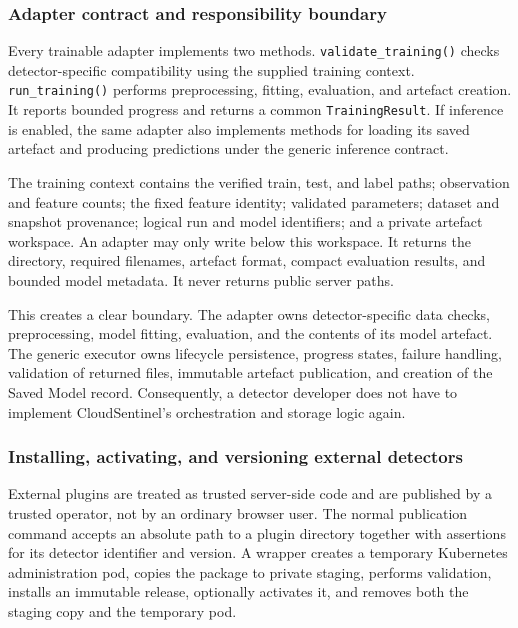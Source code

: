 \subsubsection{Adapter contract and responsibility boundary}

Every trainable adapter implements two methods. \texttt{validate\_training()} checks detector-specific compatibility using the supplied training context. \texttt{run\_training()} performs preprocessing, fitting, evaluation, and artefact creation. It reports bounded progress and returns a common \texttt{TrainingResult}. If inference is enabled, the same adapter also implements methods for loading its saved artefact and producing predictions under the generic inference contract.

The training context contains the verified train, test, and label paths; observation and feature counts; the fixed feature identity; validated parameters; dataset and snapshot provenance; logical run and model identifiers; and a private artefact workspace. An adapter may only write below this workspace. It returns the directory, required filenames, artefact format, compact evaluation results, and bounded model metadata. It never returns public server paths.

This creates a clear boundary. The adapter owns detector-specific data checks, preprocessing, model fitting, evaluation, and the contents of its model artefact. The generic executor owns lifecycle persistence, progress states, failure handling, validation of returned files, immutable artefact publication, and creation of the Saved Model record. Consequently, a detector developer does not have to implement CloudSentinel's orchestration and storage logic again.

\subsubsection{Installing, activating, and versioning external detectors}

External plugins are treated as trusted server-side code and are published by a trusted operator, not by an ordinary browser user. The normal publication command accepts an absolute path to a plugin directory together with assertions for its detector identifier and version. A wrapper creates a temporary Kubernetes administration pod, copies the package to private staging, performs validation, installs an immutable release, optionally activates it, and removes both the staging copy and the temporary pod.

